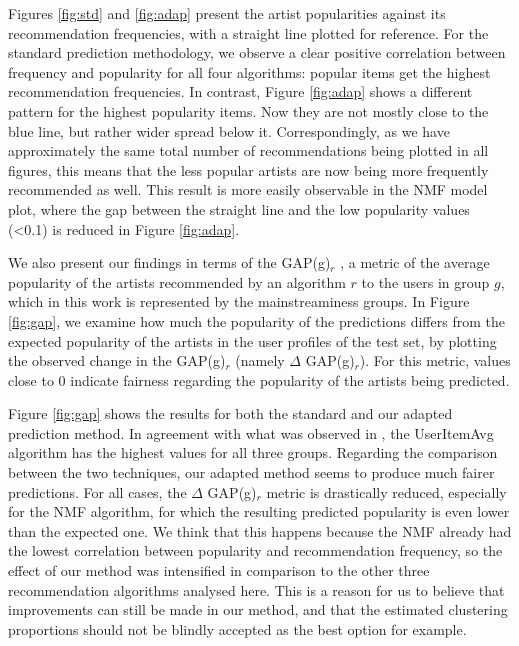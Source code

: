 \documentclass{article}
\begin{document}
Figures \ref{fig:std} and \ref{fig:adap} present the
artist popularities against its recommendation frequencies, 
with a straight line plotted for reference. 
For the standard prediction methodology, we observe a clear
positive correlation between frequency and popularity for all four
algorithms: popular items get the highest recommendation frequencies. 
In contrast, Figure \ref{fig:adap} shows a different pattern 
for the highest popularity items. Now they are not mostly 
close to the blue line, but rather wider spread below it. 
Correspondingly, as we have approximately the same total number
of recommendations being plotted in all figures,
this means that the less popular artists are now being more
frequently recommended as well. This result is more easily 
observable in the NMF model plot, where the gap between the straight
line and the low popularity values (<0.1) is reduced in 
Figure \ref{fig:adap}. 
 
 
We also present our findings in terms of the GAP(g)$_r$ \cite{pap_unfairness}, a metric of 
the average popularity of the artists recommended by
an algorithm $r$ to the users in group $g$, which in 
this work is represented by the mainstreaminess groups. In Figure \ref{fig:gap}, 
we examine how much the popularity of the predictions
differs from the expected popularity of the artists
in the user profiles of the test set, by plotting the
observed change in the GAP(g)$_r$ 
(namely $\Delta$ GAP(g)$_r$). 
For this metric, values close to 0 indicate fairness regarding
the popularity of the artists being predicted.


Figure \ref{fig:gap} shows the results for both the 
standard and our adapted prediction method. In 
agreement with what was observed in \cite{pap_unfairness},
the UserItemAvg algorithm has the highest values for all 
three groups. Regarding the comparison between the two
techniques, our adapted method seems to produce 
much fairer predictions. 
For all cases, the $\Delta$ GAP(g)$_r$ metric
is drastically reduced, especially for the NMF algorithm, 
for which the resulting predicted popularity is even
lower than the expected one. We think that this
happens because the NMF already had the lowest correlation
between popularity and recommendation frequency, so the
effect of our method was intensified in comparison to the
other three recommendation algorithms analysed here. 
This 
is a reason for us to believe that improvements can
still be made in our method, and that the estimated clustering
proportions should not be blindly accepted as the best option
for example. 
\end{document}

